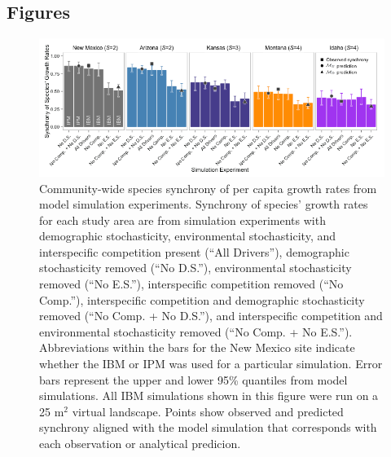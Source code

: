 \documentclass[12pt,]{article}
\begin{document}
\pagebreak{}

\subsection{Figures}\label{figures}

\begin{figure}[!ht]
  \centering
      \includegraphics[width=6in]{./components/formatted_figures/formatted_figure1.png}
  \caption{Community-wide species synchrony of per capita growth rates from model simulation experiments. Synchrony of species' growth rates for each study area are from simulation experiments with demographic stochasticity, environmental stochasticity, and interspecific competition present (``All Drivers''), demographic stochasticity removed (``No D.S.''), environmental stochasticity removed (``No E.S.''), interspecific competition removed (``No Comp.''), interspecific competition and demographic stochasticity removed (``No Comp. + No D.S.''), and interspecific competition and environmental stochasticity removed (``No Comp. + No E.S.''). Abbreviations within the bars for the New Mexico site indicate whether the IBM or IPM was used for a particular simulation. Error bars represent the upper and lower 95\% quantiles from model simulations. All IBM simulations shown in this figure were run on a 25 $\text{m}^2$ virtual landscape. Points show observed and predicted synchrony aligned with the model simulation that corresponds with each observation or analytical predicion.}
\end{figure}

\pagebreak{}
\end{document}
